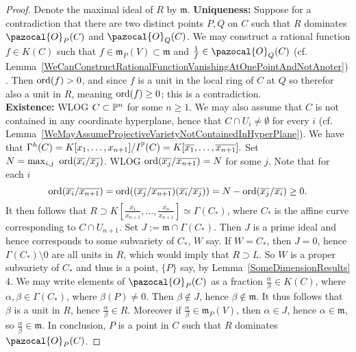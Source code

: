         \begin{proof}
            Denote the maximal ideal of $R$ by $\mathfrak{m}$.
            \textbf{Uniqueness:} Suppose for a contradiction that there are two distinct points $P,Q$ on $C$ such that $R$ dominates $\pazocal{O}_P(C)$ and $\pazocal{O}_Q(C)$. We may construct a rational function $f\in K(C)$ such that $f\in \mathfrak{m}_P(V)\subset \mathfrak{m}$ and $\frac{1}{f}\in\pazocal{O}_Q(C)$ (cf. Lemma~\ref{WeCanConstructRationalFunctionVanishingAtOnePointAndNotAnoter}). Then $\mathrm{ord}(f)>0$, and since $f$ is a unit in the local ring of $C$ at $Q$ so therefor also a unit in $R$, meaning $\mathrm{ord}(f)\geq 0$; this is a contradiction.\\
            \textbf{Existence:} WLOG $C\subset \mathbb{P}^n$ for some $n\geq 1$. We may also assume that $C$ is not contained in any coordinate hyperplane, hence that $C\cap U_i\neq \emptyset$ for every $i$ (cf. Lemma~\ref{WeMayAssumeProjectiveVarietyNotContainedInHyperPlane}). We have that $\Gamma^h(C)=K[x_1,\dots,x_{n+1}]/I^{\mathbb{P}}(C) = K[\overline{x_1},\dots,\overline{x_{n+1}}].$ Set $N= \max_{i,j}\ \ord(\overline{x_i}/\overline{x_j})$. WLOG $\mathrm{ord}(\overline{x_j}/\overline{x_{n+1}})=N$ for some $j$. Note that for each $i$
            $$ \mathrm{ord}(\overline{x_i}/\overline{x_{n+1}}) = \mathrm{ord}((\overline{x_j}/\overline{x_{n+1}})(\overline{x_i}/\overline{x_j}))=N-\mathrm{ord}(\overline{x_j}/\overline{x_i}) \geq 0.$$
            It then follows that $R\supset K\left[\frac{\overline{x_1}}{\overline{x_{n+1}}},\dots,\frac{\overline{x_{n}}}{\overline{x_{n+1}}}\right] \simeq \Gamma(C_\ast)$, where $C_\ast$ is the affine curve corresponding to $C\cap U_{n+1}$. Set $J:= \mathfrak{m}\cap \Gamma(C_\ast)$. Then $J$ is a prime ideal and hence corresponds to some subvariety of $C_\ast$, $W$ say. If $W=C_\ast$, then $J=0$, hence $\Gamma(C_\ast)\setminus 0$ are all units in $R$, which would imply that $R\supset L$. So $W$ is a proper subvariety of $C_\ast$ and thus is a point, $\{P\}$ say, by Lemma~\ref{SomeDimensionResults} 4. We may write elements of $\pazocal{O}_P(C)$ as a fraction $\frac{\alpha}{\beta}\in K(C)$, where $\alpha,\beta\in \Gamma(C_\ast)$, where $\beta(P)\neq 0$. Then $\beta\notin J$, hence $\beta\notin \mathfrak{m}$. It thus follows that $\beta$ is a unit in $R$, hence $\frac{\alpha}{\beta}\in R$. Moreover if $\frac{\alpha}{\beta}\in\mathfrak{m}_P(V)$, then $\alpha\in J$, hence $\alpha \in \mathfrak{m}$, so $\frac{\alpha}{\beta}\in \mathfrak{m}$. In conclusion, $P$ is a point in $C$ such that $R$ dominates $\pazocal{O}_P(C)$.   
        \end{proof}

